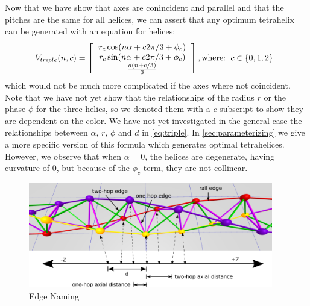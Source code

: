 \documentclass[review]{siamonline1116}
\begin{document}
Now that we have show that axes are conincident and parallel and that the pitches
are the same for all helices, we can assert that any optimum tetrahelix can
be generated with an equation for helices:
\begin{equation}
\label{eq:triple}
V_{triple}(n,c) =
\left [
  \begin{tabular}{c}
   $ r_c \cos(n \alpha +  c 2 \pi /3 + \phi_c)$\\
   $ r_c \sin(n \alpha +  c 2 \pi /3 + \phi_c) $\\
   $ \frac{d(n +c / 3)}{3}   $
  \end{tabular}
  \right ],
\text{where:}
\begin{tabular}{c}
  $c \in \{0,1,2\}$
  \end{tabular}      
\end{equation}
which would not be much more complicated if the axes where not coincident.
Note that we have not yet show that the relationships of the radius $r$ or
the phase $\phi$ for the three helies, so we denoted them with a $c$ subscript to show
they are dependent on the color.
We have not yet investigated in the general case the relationships beteween
$\alpha$, $r$, $\phi$ and $d$ in \cref{eq:triple}.
In \cref{sec:parameterizing} we give a more specific version of this formula which
generates optimal tetrahelices.
However, we observe that when $\alpha = 0$, the helices are degenerate, having curvature of $0$,
but because of the $\phi_c$ term, they are not collinear.


\begin{figure}[H]
  \centering
     \includegraphics[width=0.95\textwidth]{figures/edge-diagram.png}
     \caption{Edge Naming}
  \label{fig:naming}
\end{figure}
\end{document}
